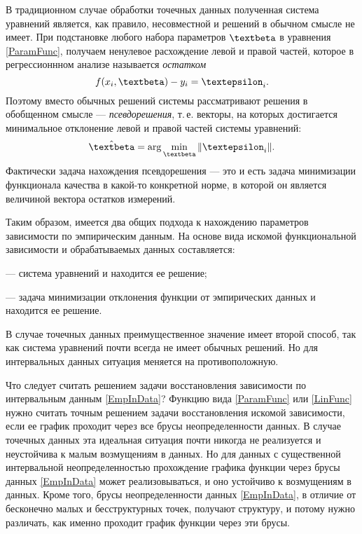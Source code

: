 \documentclass[a5paper,openany]{book}
\renewcommand{\beta}{\text{\textbeta}}
\renewcommand{\epsilon}{\text{\textepsilon}}
\begin{document}
В традиционном случае обработки точечных данных полученная система уравнений является, 
как правило, несовместной и решений в обычном смысле не имеет. При подстановке любого набора параметров 
$\beta$ в уравнения \eqref{ParamFunc}, получаем 
ненулевое расхождение левой и правой частей, которое в  регрессионнном 
анализе называется \emph{остатком}  
\begin{equation*} 
	f( x_{i}, \beta) - y_{i} = \epsilon_{i}.  
\end{equation*} 
Поэтому вместо обычных решений системы рассматривают решения в обобщенном 
смысле --- \emph{псевдорешения}, т.\,е. векторы, 
на которых достигается минимальное отклонение левой и правой частей системы уравнений:
\begin{equation*} 
	\hat{\beta} = \arg \min_{\beta}	\| \epsilon_{i} \|. %
\end{equation*}
Фактически задача нахождения 
псевдорешения --- это и есть задача минимизации функционала качества в какой-то конкретной норме, в которой он является величиной вектора остатков измерений. 

Таким образом, имеется два общих подхода к нахождению параметров зависимости 
по эмпирическим данным. На основе вида искомой функциональной зависимости и обрабатываемых данных  составляется: 
\begin{list}{}{\leftmargin=10mm\itemsep=5pt\topsep=3pt\parsep=0pt} 
	\item [---] система уравнений и находится ее решение;
	\item [---] задача минимизации отклонения функции от эмпирических данных и находится ее решение. 
\end{list}


В случае точечных данных преимущественное значение имеет второй способ, так как система 
уравнений почти всегда не имеет обычных решений. Но для интервальных данных ситуация меняется на противоположную. 

Что следует считать решением задачи восстановления зависимости по интервальным 
данным \eqref{EmpInData}? 
Функцию вида \eqref{ParamFunc} или \eqref{LinFunc} нужно считать точным 
решением задачи восстановления искомой зависимости, если ее график проходит через все 
брусы неопределенности данных. В случае точечных данных эта идеальная ситуация почти 
никогда не реализуется и неустойчива к малым возмущениям в данных. Но для данных 
с существенной интервальной неопределенностью прохождение графика функции через брусы 
данных \eqref{EmpInData} может реализовываться, и оно устойчиво к возмущениям в данных. 
Кроме того,  брусы неопределенности данных \eqref{EmpInData}, в отличие от бесконечно малых и бесструктурных точек, получают структуру, и потому нужно различать, как именно проходит график функции через эти брусы. 
\end{document}
